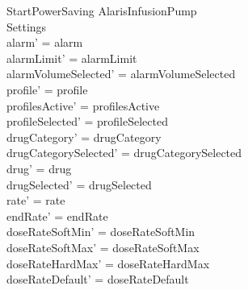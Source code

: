 \begin{schema}{StartPowerSaving}
	\Delta AlarisInfusionPump\\
	Settings\\
	\where
	alarm' = alarm\\
	alarmLimit' = alarmLimit\\
	alarmVolumeSelected' = alarmVolumeSelected\\
	profile' = profile\\
	profilesActive' = profilesActive\\  
	  profileSelected' = profileSelected\\
	  
	drugCategory' = drugCategory\\ drugCategorySelected' = drugCategorySelected\\
	drug' = drug\\ drugSelected' = drugSelected\\
	rate' = rate\\
	
	endRate' = endRate\\
	doseRateSoftMin' = doseRateSoftMin\\
	doseRateSoftMax' = doseRateSoftMax\\
	\pagebreak
	doseRateHardMax' = doseRateHardMax\\
	doseRateDefault' = doseRateDefault\\
	

\end{schema}
